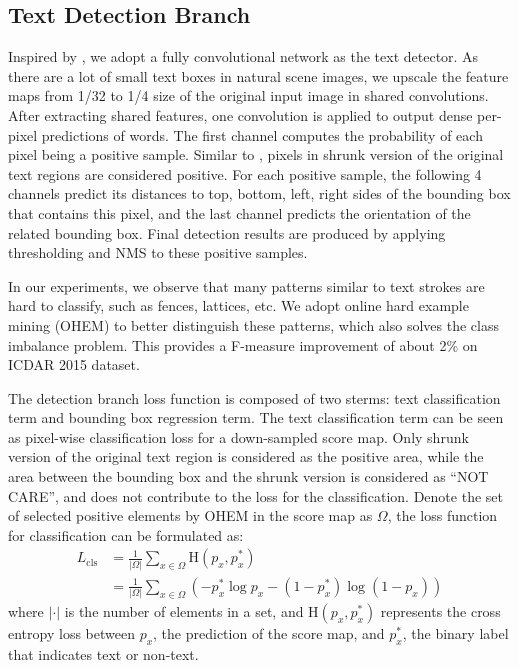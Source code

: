 \documentclass[10pt,twocolumn,letterpaper]{article}
\begin{document}
\subsection{Text Detection Branch}
\label{detect}
Inspired by \cite{zhou2017east,he2017casia}, we adopt a fully convolutional network as the text detector. As there are a lot of small text boxes in natural scene images, we upscale the feature maps from 1/32 to 1/4 size of the original input image in shared convolutions. After extracting shared features, one convolution is applied to output dense per-pixel predictions of words. The first channel computes the probability of each pixel being a positive sample. Similar to \cite{zhou2017east}, pixels in shrunk version of the original text regions are considered positive. For each positive sample, the following 4 channels predict its distances to top, bottom, left, right sides of the bounding box that contains this pixel, and the last channel predicts the orientation of the related bounding box. Final detection results are produced by applying thresholding and NMS to these positive samples.

In our experiments, we observe that many patterns similar to text strokes are hard to classify, such as fences, lattices, etc. We adopt online hard example mining (OHEM) \cite{shrivastava2016ohem} to better distinguish these patterns, which also solves the class imbalance problem. This provides a F-measure improvement of about 2\% on ICDAR 2015 dataset.

The detection branch loss function is composed of two sterms: text classification term and bounding box regression term. The text classification term can be seen as pixel-wise classification loss for a down-sampled score map. Only shrunk version of the original text region is considered as the positive area, while the area between the bounding box and the shrunk version is considered as ``NOT CARE'', and does not contribute to the loss for the classification. Denote the set of selected positive elements by OHEM in the score map as $\Omega$, the loss function for classification can be formulated as:
\begin{equation}
\begin{split}
L_{\text{cls}} &= \frac{1}{|\Omega|} \sum_{x \in \Omega} \text{H}(p_x, p_x^*) \\
&= \frac{1}{|\Omega|} \sum_{x \in \Omega} (-p_x^*\log p_x - (1 - p_x^*)\log(1 - p_x))
\end{split}
\end{equation}
where $|\cdot|$ is the number of elements in a set, and H$(p_x, p_x^*)$ represents the cross entropy loss between $p_x$, the prediction of the score map, and $p_x^*$, the binary label that indicates text or non-text.
\end{document}
